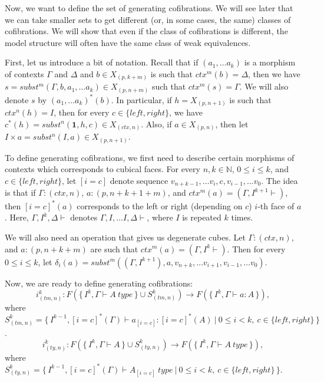 \documentclass[reqno]{amsart}
\theoremstyle{definition}
\theoremstyle{remark}
\newcommand{\emptyCtx}{\mathbf{1}}
\numberwithin{figure}{section}
\begin{document}
Now, we want to define the set of generating cofibrations.
We will see later that we can take smaller sets to get different (or, in some cases, the same) classes of cofibrations.
We will show that even if the class of cofibrations is different,
the model structure will often have the same class of weak equivalences.

First, let us introduce a bit of notation.
Recall that if $(a_1, \ldots a_k)$ is a morphism of contexts $\Gamma$ and $\Delta$ and $b \in X_{(p,k+m)}$ is such that $ctx^m(b) = \Delta$,
then we have $s = subst^m(\Gamma, b, a_1, \ldots a_k) \in X_{(p,n+m)}$ such that $ctx^m(s) = \Gamma$.
We will also denote $s$ by $(a_1, \ldots a_k)^*(b)$.
In particular, if $h = X_{(p,n+1)}$ is such that $ctx^n(h) = I$, then for every $c \in \{ left, right \}$, we have $c^*(h) = subst^n(\emptyCtx, h, c) \in X_{(ctx,n)}$.
Also, if $a \in X_{(p,n)}$, then let $I \times a = subst^n(I, a) \in X_{(p,n+1)}$.

To define generating cofibrations, we first need to describe certain morphisms of contexts which corresponds to cubical faces.
For every $n,k \in \mathbb{N}$, $0 \leq i \leq k$, and $c \in \{ left, right \}$, let $[i = c]$ denote sequence $v_{n+k-1}, \ldots v_i, c, v_{i-1}, \ldots v_0$.
The idea is that if $\Gamma : (ctx,n)$, $a : (p,n+k+1+m)$, and $ctx^m(a) = (\Gamma, I^{k+1} \vdash)$,
then $[i = c]^*(a)$ corresponds to the left or right (depending on $c$) $i$-th face of $a$.
Here, $\Gamma, I^k, \Delta \vdash$ denotes $\Gamma, I, \ldots I, \Delta \vdash$, where $I$ is repeated $k$ times.

We will also need an operation that gives us degenerate cubes.
Let $\Gamma : (ctx,n)$, and $a : (p,n+k+m)$ are such that $ctx^m(a) = (\Gamma, I^k \vdash)$.
Then for every $0 \leq i \leq k$, let $\delta_i(a) = subst^m((\Gamma, I^{k+1}), a, v_{n+k}, \ldots v_{i+1}, v_{i-1}, \ldots v_0)$.

Now, we are ready to define generating cofibrations:
\[ i^k_{(tm,n)} : F(\{\,I^k, \Gamma \vdash A\ type\,\} \cup S^k_{(tm,n)}) \to F(\{\,I^k, \Gamma \vdash a : A\,\}), \]
where $S^k_{(tm,n)} = \{\,I^{k-1}, [i = c]^*(\Gamma) \vdash a_{[i = c]} : [i = c]^*(A)\ |\ 0 \leq i < k,\ c \in \{ left, right \}\,\}$.
\[ i^k_{(ty,n)} : F(\{\,I^k, \Gamma \vdash A\,\} \cup S^k_{(ty,n)}) \to F(\{\,I^k, \Gamma \vdash A\ type\,\}), \]
where $S^k_{(ty,n)} = \{\,I^{k-1}, [i = c]^*(\Gamma) \vdash A_{[i = c]}\ type\ |\ 0 \leq i < k,\ c \in \{ left, right \}\,\}$.
\end{document}
